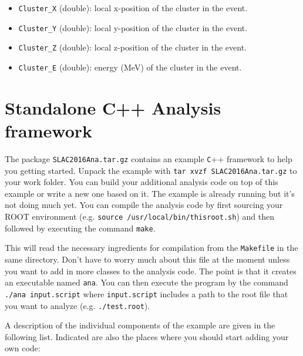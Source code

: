 \documentclass[12pt,letterpaper]{article}
\begin{document}
\begin{itemize}
\item \verb+Cluster_X+ (double): local x-position of the cluster in the event. 
\item \verb+Cluster_Y+ (double): local y-position of the cluster in the event. 
\item \verb+Cluster_Z+ (double): local z-position of the cluster in the event. 
\item \verb+Cluster_E+ (double): energy (MeV) of the cluster in the event. 

\end{itemize}

\section{Standalone C++ Analysis framework}

The package \verb+SLAC2016Ana.tar.gz+ contains an example \verb+C+++ framework to help you getting started. Unpack the example with \verb+tar xvzf SLAC2016Ana.tar.gz+ to your work folder. You can build your additional analysis code on top of this example or write a new one based on it. The example is already running but it's not doing much yet. You can compile the analysis code by first sourcing your ROOT environment (e.g. \verb+source /usr/local/bin/thisroot.sh+) and then followed by executing the command \verb+make+.

This will read the necessary ingredients for compilation from the \verb+Makefile+ in the same directory. Don't have to worry much about this file at the moment unless you want to add in more classes to the analysis code.
The point is that it creates an executable named \verb+ana+. You can then execute the program by the command \verb+./ana input.script+ where \verb+input.script+ includes a path to the root file that you want to analyze (e.g. \verb+./test.root+). 

A description of the individual components of the example are given in the following list. Indicated are also the places where you should start adding your own code:
\end{document}
